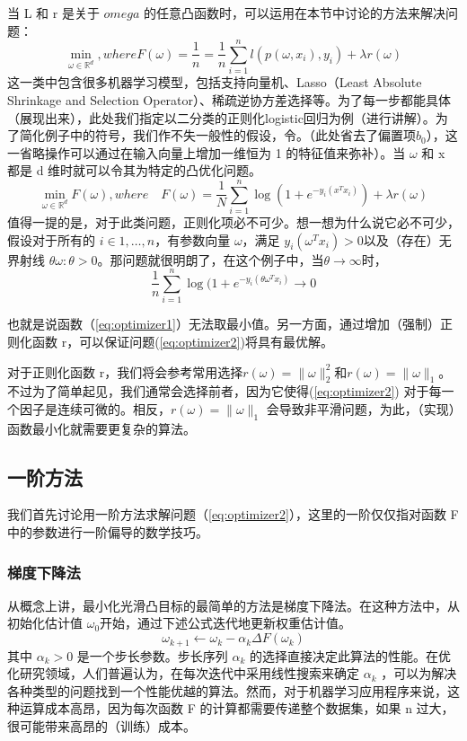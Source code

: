 \documentclass{book}
\begin{document}
当 L 和 r 是关于 $omega$ 的任意凸函数时，可以运用在本节中讨论的方法来解决问题：
\begin{equation}\label{eq:optimizer1}
	\min_{\omega\in\mathbb{R}^d},where F(\omega)=\frac{1}{n}=\frac{1}{n}\sum_{i=1}^n l(p(\omega,x_i),y_i)+\lambda r(\omega)
\end{equation}
这一类中包含很多机器学习模型，包括支持向量机、Lasso（Least Absolute Shrinkage and Selection Operator）、稀疏逆协方差选择等。为了每一步都能具体（展现出来），此处我们指定以二分类的正则化logistic回归为例（进行讲解）。为了简化例子中的符号，我们作不失一般性的假设，令。（此处省去了偏置项$b_0$），这一省略操作可以通过在输入向量上增加一维恒为 1 的特征值来弥补）。当 $\omega$ 和 x 都是 d 维时就可以令其为特定的凸优化问题。
\begin{equation}\label{eq:optimizer2}
	\min_{\omega\in\mathbb{R}^d}F(\omega),where\quad F(\omega)=\frac{1}{N}\sum_{i=1}^n\log(1+e^{-y_i(x^Tx_i)})+\lambda r(\omega)
\end{equation}
值得一提的是，对于此类问题，正则化项必不可少。想一想为什么说它必不可少，假设对于所有的 $i\in{1,\ldots,n}$，有参数向量 $\omega$，满足 $y_i(\omega^Tx_i) > 0 $以及（存在）无界射线 {$\theta \omega:\theta > 0$}。那问题就很明朗了，在这个例子中，当$\theta\rightarrow \infty$时，
\begin{equation}\label{eq:optimizer3}
	\frac{1}{n}\sum_{i=1}^n\log(1+e^{-y_i(\theta\omega^Tx_i)}\rightarrow 0
\end{equation}


也就是说函数（\ref{eq:optimizer1}）无法取最小值。另一方面，通过增加（强制）正则化函数 r，可以保证问题(\ref{eq:optimizer2})将具有最优解。

对于正则化函数 r，我们将会参考常用选择$r(\omega) = \|\omega\|_2^2$和$r(\omega)=\|\omega\|_1$。不过为了简单起见，我们通常会选择前者，因为它使得(\ref{eq:optimizer2}) 对于每一个因子是连续可微的。相反，$r(\omega) = \|\omega\|_1$ 会导致非平滑问题，为此，（实现）函数最小化就需要更复杂的算法。

\subsection{一阶方法}
我们首先讨论用一阶方法求解问题（\ref{eq:optimizer2}），这里的一阶仅仅指对函数 F 中的参数进行一阶偏导的数学技巧。

\subsubsection{梯度下降法}

从概念上讲，最小化光滑凸目标的最简单的方法是梯度下降法。在这种方法中，从初始化估计值 $\omega_0$开始，通过下述公式迭代地更新权重估计值。
\begin{equation}\label{eq:optimizer4}
	\omega_{k+1}\leftarrow \omega_k - \alpha_k\Delta F(\omega_k)
\end{equation}
其中 $\alpha_k > 0$ 是一个步长参数。步长序列 {$\alpha_k$} 的选择直接决定此算法的性能。在优化研究领域，人们普遍认为，在每次迭代中采用线性搜索来确定 {$\alpha_k$ }，可以为解决各种类型的问题找到一个性能优越的算法。然而，对于机器学习应用程序来说，这种运算成本高昂，因为每次函数 F 的计算都需要传递整个数据集，如果 n 过大，很可能带来高昂的（训练）成本。
\end{document}
